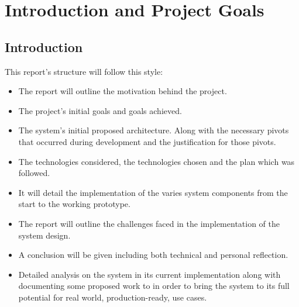 \chapter{Introduction and Project Goals}
\label{chap:intro}

\section{Introduction}
This report's structure will follow this style:
\begin{itemize}
	\item The report will outline the motivation behind the project.
	\item The project's initial goals and goals achieved.
	\item The system's initial proposed architecture. Along with the necessary pivots
	      that occurred during development and the justification for those pivots.
	\item The technologies considered, the technologies chosen and the plan which was followed.
	\item It will detail the implementation of the varies system components from the start to the working prototype.
	\item The report will outline the challenges faced in the implementation of the system design.
	\item A conclusion will be given including both technical and personal reflection.
	\item Detailed analysis on the system in its current implementation along with
	      documenting some proposed work to in order to bring the system to its full potential for
	      real world, production-ready, use cases.
\end{itemize}
